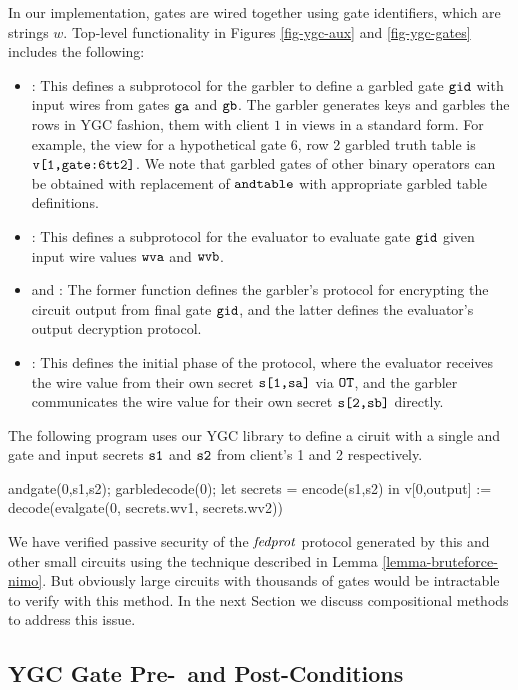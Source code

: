 In our implementation, gates are wired together using gate
identifiers, which are strings $w$. Top-level functionality in Figures
\ref{fig-ygc-aux} and \ref{fig-ygc-gates} includes the following:
\begin{itemize}
\item {}: This defines a subprotocol for the garbler
  to define a garbled gate $\texttt{gid}$ with input wires from gates
  $\texttt{ga}$ and $\texttt{gb}$. The garbler generates keys and garbles
  the rows in YGC fashion, them with client $1$ in
  views in a standard form. For example, the view for
  a hypothetical gate 6, row 2 garbled truth table is $\texttt{v[1,gate:6tt2]}$.
  We note that garbled gates of other binary operators can be obtained with
  replacement of $\texttt{andtable}$ with appropriate garbled  table definitions. 
\item {}: This defines a subprotocol for the evaluator to
  evaluate gate $\texttt{gid}$ given input wire values $\texttt{wva}$ and
  $\texttt{wvb}$.
\item {} and : The former function
  defines the garbler's protocol for encrypting the circuit
  output from final gate $\texttt{gid}$, and the latter defines
  the evaluator's output decryption protocol.
\item {}: This defines the initial phase of the protocol,
  where the evaluator receives the wire value from their own
  secret $\texttt{s[1,sa]}$ via $\texttt{OT}$, and the garbler communicates
  the wire value for their own secret $\texttt{s[2,sb]}$ directly.
\end{itemize}
\begin{example}
  \label{example-andcircuit}
The following program uses our YGC library to define
a ciruit with a single and gate and input secrets $\texttt{s1}$ and
$\texttt{s2}$ from client's 1 and 2 respectively. 
\begin{verbatimtab}
  andgate(0,s1,s2);
  garbledecode(0);
  let secrets = encode(s1,s2) in
  v[0,output] := decode(evalgate(0, secrets.wv1, secrets.wv2))
\end{verbatimtab}
\end{example}
We have verified passive security of the $\mathit{fedprot}$ protocol
generated by this and other small circuits using the
technique described in Lemma \ref{lemma-bruteforce-nimo}.
But obviously large circuits with thousands of gates would be
intractable to verify with this method. In the next Section
we discuss compositional methods to address this issue.

\subsection{YGC Gate Pre-~and Post-Conditions}

